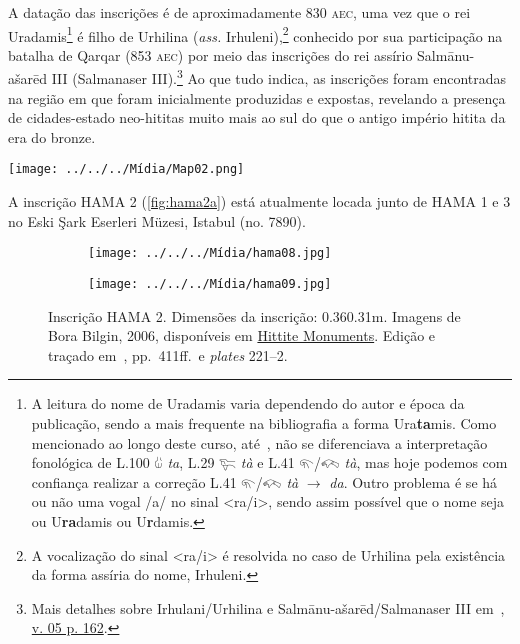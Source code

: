 A datação das inscrições é de aproximadamente 830 \textsc{aec}, uma vez que
o rei
Uradamis\footnote{A leitura do nome de Uradamis varia dependendo do autor e
	época da publicação, sendo a mais frequente na bibliografia a forma
	Ura\textbf{ta}mis.
	Como mencionado ao longo deste curso, até~\citet{Rieken2008}, não se
	diferenciava a interpretação fonológica de
	L.100 𔑰 \emph{ta}, L.29 𔐞 \emph{tà} e L.41 𔐬\slash{}𔐫 \emph{tà}, mas hoje
	podemos com confiança realizar a correção L.41 𔐬\slash{}𔐫 \emph{tà}
	$\rightarrow$ \emph{da}. Outro problema é se há ou não uma vogal /a/ no sinal
	<ra\slash{}i>, sendo assim possível que o nome seja ou U\textbf{ra}damis ou
	U\textbf{r}damis.
} é filho de Urhilina (\emph{ass.} Irhuleni),\footnote{
	A vocalização do sinal <ra\slash{}i> é resolvida no caso de Urhilina pela
	existência da forma assíria do nome, Irhuleni.
} conhecido por sua
participação na batalha de Qarqar (853 \textsc{aec}) por meio das inscrições
do rei assírio Salmānu-ašarēd III (Salmanaser III).\footnote{Mais detalhes
	sobre Irhulani\slash{}Urhilina e Salmānu-ašarēd\slash{}Salmanaser III
	em~,
	\href{https://publikationen.badw.de/en/rla/index\#5833}{v. 05 p. 162}.
}
Ao que tudo indica, as inscrições foram encontradas na região em que foram
inicialmente produzidas e expostas, revelando a presença de cidades-estado
neo-hititas muito mais ao sul do que o antigo império hitita da era do bronze.

\begin{flushright}
	\texttt{[image: ../../../Mídia/Map02.png]}
\end{flushright}

A inscrição HAMA 2 (\autoref{fig:hama2a}) está atualmente locada junto de HAMA
1 e 3 no Eski Şark Eserleri Müzesi, Istabul (no. 7890).

\begin{figure}[h]
	\centering
	\begin{subfigure}{0.49\textwidth}
		\texttt{[image: ../../../Mídia/hama08.jpg]}
	\end{subfigure}
	\begin{subfigure}{0.49\textwidth}
		\texttt{[image: ../../../Mídia/hama09.jpg]}
	\end{subfigure}
	\caption[HAMA 2]{Inscrição HAMA 2. Dimensões da inscrição:
		0.36\times0.31m.
		Imagens de Bora Bilgin, 2006,
		disponíveis em
		\href{https://www.hittitemonuments.com/hama/}{Hittite Monuments}.
		Edição e traçado em~, pp.\ 411ff.\ e \emph{plates}
		221--2.
	}\label{fig:hama2a}
\end{figure}

